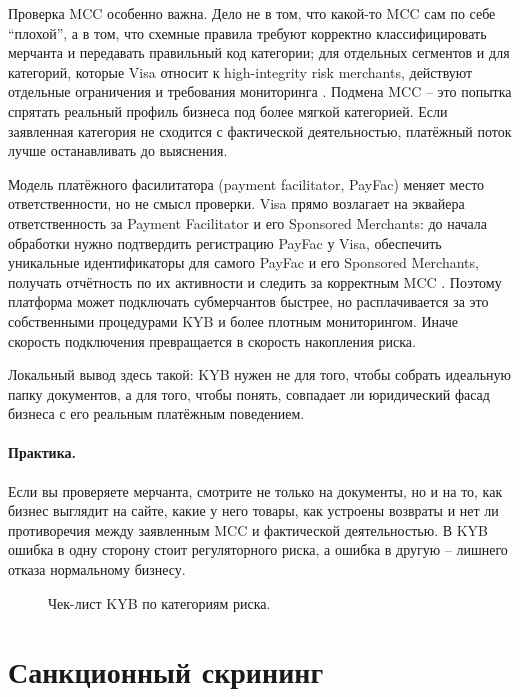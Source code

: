 Проверка MCC особенно важна. Дело не в том, что какой-то MCC сам по
себе \enquote{плохой}, а в том, что схемные правила требуют
корректно классифицировать мерчанта и передавать правильный код
категории; для отдельных сегментов и для категорий, которые Visa
относит к high-integrity risk merchants, действуют отдельные
ограничения и требования мониторинга \cite{visa-core-rules}.
Подмена MCC -- это попытка спрятать реальный профиль бизнеса под
более мягкой категорией. Если заявленная категория не сходится с
фактической деятельностью, платёжный поток лучше останавливать до
выяснения.

Модель платёжного фасилитатора (payment facilitator, PayFac)
меняет место ответственности, но не смысл проверки. Visa прямо
возлагает на эквайера ответственность за Payment Facilitator и его
Sponsored Merchants: до начала обработки нужно подтвердить
регистрацию PayFac у Visa, обеспечить уникальные идентификаторы для
самого PayFac и его Sponsored Merchants, получать отчётность по их
активности и следить за корректным MCC
\cite{visa-core-rules}. Поэтому платформа может подключать
субмерчантов быстрее, но расплачивается за это собственными
процедурами KYB и более плотным мониторингом. Иначе скорость
подключения превращается в скорость накопления риска.

Локальный вывод здесь такой: KYB нужен не для того, чтобы собрать
идеальную папку документов, а для того, чтобы понять, совпадает ли
юридический фасад бизнеса с его реальным платёжным поведением.

\paragraph{Практика.}
  Если вы проверяете мерчанта, смотрите не только на документы, но и
  на то, как бизнес выглядит на сайте, какие у него товары, как
  устроены возвраты и нет ли противоречия между заявленным MCC и
  фактической деятельностью. В KYB ошибка в одну сторону стоит
  регуляторного риска, а ошибка в другую -- лишнего отказа
  нормальному бизнесу.


\begin{figure}
  \centering
  \caption{Чек-лист KYB по категориям риска.}
  \label{fig:compliance-kyb-risk}
\end{figure}

\section{Санкционный скрининг}
\label{sec:compliance-sanctions}


